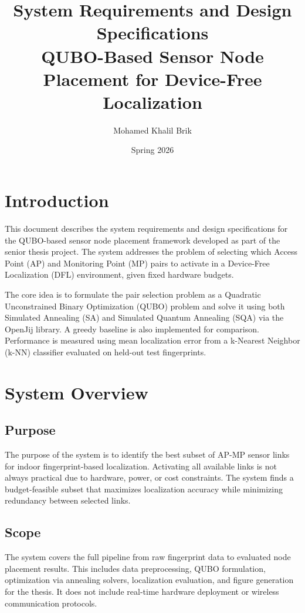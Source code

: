 \documentclass[12pt,a4paper]{article}
\title{
    \textbf{System Requirements and Design Specifications} \\[0.5em]
    \large QUBO-Based Sensor Node Placement for Device-Free Localization
}
\author{Mohamed Khalil Brik}
\date{Spring 2026}
\begin{document}
\maketitle
\tableofcontents
\newpage

\section{Introduction}

This document describes the system requirements and design specifications for
the QUBO-based sensor node placement framework developed as part of the senior
thesis project. The system addresses the problem of selecting which Access
Point (AP) and Monitoring Point (MP) pairs to activate in a Device-Free
Localization (DFL) environment, given fixed hardware budgets.

The core idea is to formulate the pair selection problem as a Quadratic
Unconstrained Binary Optimization (QUBO) problem and solve it using both
Simulated Annealing (SA) and Simulated Quantum Annealing (SQA) via the
OpenJij library. A greedy baseline is also implemented for comparison.
Performance is measured using mean localization error from a k-Nearest
Neighbor (k-NN) classifier evaluated on held-out test fingerprints.

\section{System Overview}

\subsection{Purpose}

The purpose of the system is to identify the best subset of AP-MP sensor
links for indoor fingerprint-based localization. Activating all available
links is not always practical due to hardware, power, or cost constraints.
The system finds a budget-feasible subset that maximizes localization accuracy
while minimizing redundancy between selected links.

\subsection{Scope}

The system covers the full pipeline from raw fingerprint data to evaluated
node placement results. This includes data preprocessing, QUBO formulation,
optimization via annealing solvers, localization evaluation, and figure
generation for the thesis. It does not include real-time hardware deployment
or wireless communication protocols.
\end{document}
